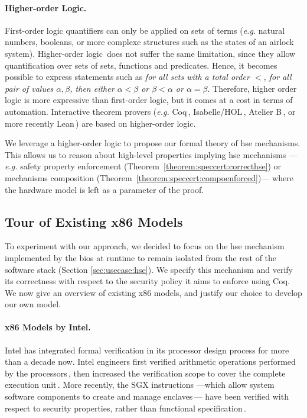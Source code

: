 \paragraph{Higher-order Logic.}
%
First-order logic quantifiers can only be applied on sets of terms (\emph{e.g.}
natural numbers, booleans, or more complexe structures such as the states of an
airlock system).
%
Higher-order logic\,\cite{leivant1994hol} does not suffer the same limitation,
since they allow quantification over sets of sets, functions and predicates.
%
Hence, it becomes possible to express statements such as \emph{for all sets with
  a total order \( < \), for all pair of values \( \alpha, \beta \), then either
  \( \alpha < \beta \) or \( \beta < \alpha \) or \( \alpha = \beta \)}.
%
Therefore, higher order logic is more expressive than first-order logic, but it
comes at a cost in terms of automation.
%
Interactive theorem provers (\emph{e.g.}  Coq\,\cite{coq},
Isabelle/HOL\,\cite{nipkow2002isabelle}, Atelier B\,\cite{abrial2005b}, or more
recently Lean\,\cite{de2015lean}) are based on higher-order logic.

We leverage a higher-order logic to propose our formal theory of \ac{hse}
mechanisms.
%
This allows us to reason about high-level properties implying \ac{hse}
mechanisms ---\emph{e.g.} safety property enforcement
(Theorem~\ref{theorem:speccert:correcthse}) or mechanisms composition
(Theorem~\ref{theorem:speccert:compoenforced})--- where the hardware model is
left as a parameter of the proof.

\subsection{Tour of Existing x86 Models}
\label{subsec:sota:ltsrelated}

To experiment with our approach, we decided to focus on the \ac{hse} mechanism
implemented by the \ac{bios} at runtime to remain isolated from the rest of the
software stack (Section \ref{sec:usecase:hse}). We specify this mechanism and
verify its correctness with respect to the security policy it aims to enforce
using Coq.
%
We now give an overview of existing x86 models, and justify our choice to
develop our own model.

\paragraph{x86 Models by Intel.}
%
Intel has integrated formal verification in its processor design process for
more than a decade now.
%
Intel engineers first verified arithmetic operations performed by the
processors\,\cite{harrison2000x86}, then increased the verification scope to
cover the complete execution unit\,\cite{kaivola2009formalintel}.
%
More recently, the SGX instructions ---which allow system software components to
create and manage enclaves\,\cite{costan2016sgxexplained}--- have been verified
with respect to security properties, rather than functional
specification\,\cite{leslie2015linsgx}.
%

